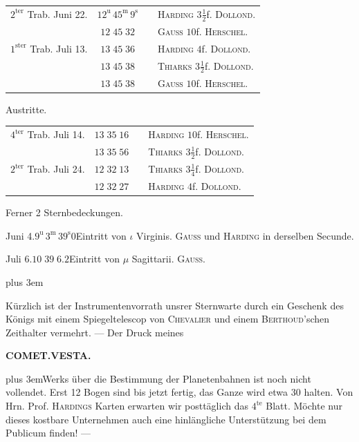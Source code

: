 \begin{center}
\fontsize{10}{12}\selectfont\setlength{\tabcolsep}{3pt}\begin{tabular}{lccl}
$2^{\text{ter}}$ Trab. Juni 22. & $12^{\text{u}}\,45^{\text{m}}\,9^{\text{s}}$ & & \textsc{Harding} $3\tfrac12$f. \textsc{Dollond}.\\
& $12\;45\;32$ & & \textsc{Gauss} $10$f. \textsc{Herschel}.\\
$1^{\text{ster}}$ Trab. Juli 13. & $13\;45\;36$ & & \textsc{Harding} $4$f. \textsc{Dollond}.\\
& $13\;45\;38$ & & \textsc{Thiarks} $3\tfrac12$f. \textsc{Dollond}.\\
& $13\;45\;38$ & & \textsc{Gauss} $10$f. \textsc{Herschel}.\\
\end{tabular}

Austritte.

\fontsize{10}{12}\selectfont\setlength{\tabcolsep}{3pt}\begin{tabular}{lccl}
$4^{\text{ter}}$ Trab. Juli 14. & $13\;35\;16$ & & \textsc{Harding} $10$f. \textsc{Herschel}.\\
& $13\;35\;56$ & & \textsc{Thiarks} $3\tfrac12$f. \textsc{Dollond}.\\
$2^{\text{ter}}$ Trab. Juli 24. & $12\;32\;13$ & & \textsc{Thiarks} $3\tfrac14$f. \textsc{Dollond}.\\
& $12\;32\;27$ & & \textsc{Harding} $4$f. \textsc{Dollond}.\\
\end{tabular}
\end{center}

\par\indent Ferner 2 Sternbedeckungen.

\smallskip
\noindent Juni 4.\quad $9^{\text{u}}\,3^{\text{m}}\,39^{\text{s}}0$\quad Eintritt von $\iota$ Virginis. \textsc{Gauss} und \textsc{Harding} in derselben Secunde.

\smallskip
\noindent Juli 6.\quad $10\;39\;6.2$\quad Eintritt von $\mu$ Sagittarii. \textsc{Gauss}.

\smallskip
{\rightskip=0pt plus 3em\par\indent Kürzlich ist der Instrumentenvorrath unsrer Sternwarte durch ein Geschenk des Königs mit
einem Spiegeltelescop von \textsc{Chevalier} und einem \textsc{Berthoud}'schen Zeithalter vermehrt. --- Der
Druck meines\par}
\clearpage
\thispagestyle{empty}
\noindent{}%
%
\parbox[t]{\dimexpr\linewidth-24mm\relax}{\centering\footnotesize\bfseries COMET.\quad VESTA.\par}%
\makebox[12mm][r]{}\par\nobreak\medskip
{\rightskip=0pt plus 3em\noindent Werks über die Bestimmung der Planetenbahnen ist noch nicht vollendet. Erst 12 Bogen sind
bis jetzt fertig, das Ganze wird etwa 30 halten. Von Hrn. Prof. \textsc{Hardings} Karten erwarten
wir posttäglich das $4^{\text{te}}$ Blatt. Möchte nur dieses kostbare Unternehmen auch eine
hinlängliche Unterstützung bei dem Publicum finden! ---\par}
